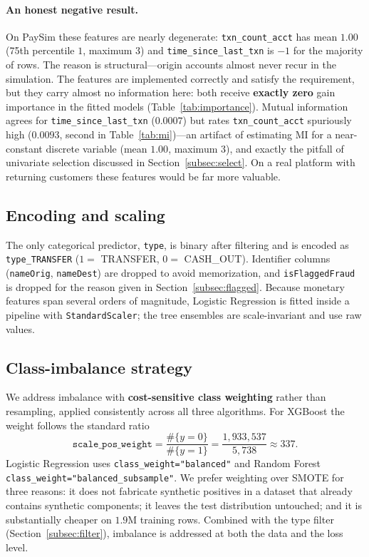 \documentclass{article}
\begin{document}
\paragraph{An honest negative result.} On PaySim these features are
nearly degenerate: \texttt{txn\_count\_acct} has mean $1.00$ (75th
percentile $1$, maximum $3$) and \texttt{time\_since\_last\_txn} is
$-1$ for the majority of rows. The reason is structural---origin
accounts almost never recur in the simulation. The features are
implemented correctly and satisfy the requirement, but they carry
almost no information here: both receive \textbf{exactly zero} gain
importance in the fitted models (Table~\ref{tab:importance}). Mutual
information agrees for \texttt{time\_since\_last\_txn} ($0.0007$) but
rates \texttt{txn\_count\_acct} spuriously high ($0.0093$, second in
Table~\ref{tab:mi})---an artifact of estimating MI for a near-constant
discrete variable (mean $1.00$, maximum $3$), and exactly the pitfall of
univariate selection discussed in Section~\ref{subsec:select}. On a real
platform with returning customers these features would be far more
valuable.

\subsection{Encoding and scaling}
The only categorical predictor, \texttt{type}, is binary after
filtering and is encoded as \texttt{type\_TRANSFER}
($1 =$ TRANSFER, $0 =$ CASH\_OUT). Identifier columns
(\texttt{nameOrig}, \texttt{nameDest}) are dropped to avoid
memorization, and \texttt{isFlaggedFraud} is dropped for the reason
given in Section~\ref{subsec:flagged}. Because monetary features span
several orders of magnitude, Logistic Regression is fitted inside a
pipeline with \texttt{StandardScaler}; the tree ensembles are
scale-invariant and use raw values.

\subsection{Class-imbalance strategy}
\label{subsec:imbalance}
We address imbalance with \textbf{cost-sensitive class weighting}
rather than resampling, applied consistently across all three
algorithms. For XGBoost the weight follows the standard ratio
\begin{equation}
\texttt{scale\_pos\_weight} = \frac{\#\{y = 0\}}{\#\{y = 1\}}
 = \frac{1{,}933{,}537}{5{,}738} \approx 337.
\label{eq:spw}
\end{equation}
Logistic Regression uses \texttt{class\_weight="balanced"} and Random
Forest \texttt{class\_weight="balanced\_subsample"}. We prefer
weighting over SMOTE for three reasons: it does not fabricate synthetic
positives in a dataset that already contains synthetic components; it
leaves the test distribution untouched; and it is substantially cheaper
on $1.9$M training rows. Combined with the type filter
(Section~\ref{subsec:filter}), imbalance is addressed at both the data
and the loss level.
\end{document}
